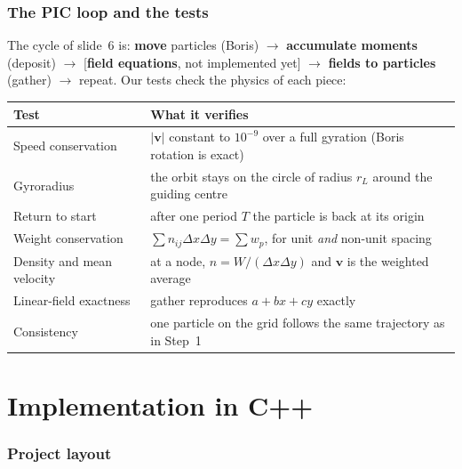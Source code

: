 \documentclass[11pt,a4paper]{article}
\newcommand{\vv}{\mathbf{v}}
\begin{document}
\section{The PIC loop and the tests}

The cycle of slide~6 is: \textbf{move} particles (Boris) $\to$ \textbf{accumulate moments} (deposit)
$\to$ [\textbf{field equations}, not implemented yet] $\to$ \textbf{fields to particles} (gather)
$\to$ repeat. Our tests check the physics of each piece:
\begin{center}
\begin{tabular}{p{4.2cm}p{9.5cm}}
\toprule
Test & What it verifies\\
\midrule
Speed conservation & $|\vv|$ constant to $10^{-9}$ over a full gyration (Boris rotation is exact)\\
Gyroradius & the orbit stays on the circle of radius $r_L$ around the guiding centre\\
Return to start & after one period $T$ the particle is back at its origin\\
Weight conservation & $\sum n_{ij}\Delta x\Delta y=\sum w_p$, for unit \emph{and} non-unit spacing\\
Density and mean velocity & at a node, $n=W/(\Delta x\Delta y)$ and $\vv$ is the weighted average\\
Linear-field exactness & gather reproduces $a+bx+cy$ exactly\\
Consistency & one particle on the grid follows the same trajectory as in Step~1\\
\bottomrule
\end{tabular}
\end{center}

\part{Implementation in C++}

\section{Project layout}
\end{document}
